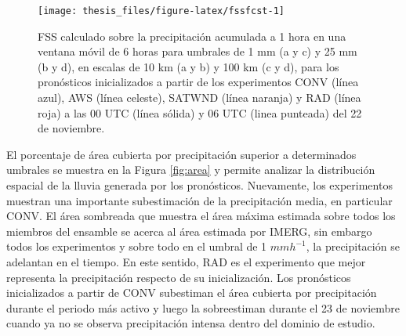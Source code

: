 \documentclass[12pt,oneside,a4paper]{reedthesis}
\begin{document}
\begin{figure}
\texttt{[image: thesis\_files/figure-latex/fssfcst-1]} \caption{FSS calculado sobre la precipitación acumulada a 1 hora en una ventana móvil de 6 horas para umbrales de 1 mm (a y c) y 25 mm (b y d), en escalas de 10 km (a y b) y 100 km (c y d), para los pronósticos inicializados a partir de los experimentos CONV (línea azul), AWS (línea celeste), SATWND (línea naranja) y RAD (línea roja) a las 00 UTC (línea sólida) y 06 UTC (linea punteada) del 22 de noviembre.}\label{fig:fssfcst}
\end{figure}
El porcentaje de área cubierta por precipitación superior a determinados umbrales se muestra en la Figura \ref{fig:area} y permite analizar la distribución espacial de la lluvia generada por los pronósticos. Nuevamente, los experimentos muestran una importante subestimación de la precipitación media, en particular CONV. El área sombreada que muestra el área máxima estimada sobre todos los miembros del ensamble se acerca al área estimada por IMERG, sin embargo todos los experimentos y sobre todo en el umbral de 1 \(mmh^{-1}\), la precipitación se adelantan en el tiempo. En este sentido, RAD es el experimento que mejor representa la precipitación respecto de su inicialización. Los pronósticos inicializados a partir de CONV subestiman el área cubierta por precipitación durante el periodo más activo y luego la sobreestiman durante el 23 de noviembre cuando ya no se observa precipitación intensa dentro del dominio de estudio.
\end{document}
